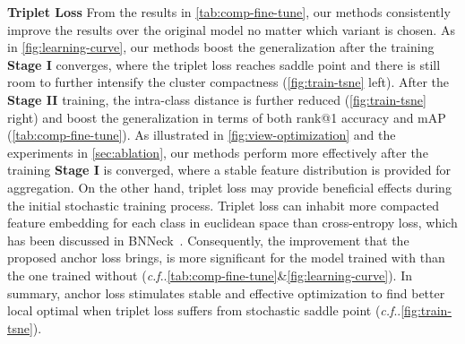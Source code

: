\documentclass[runningheads]{llncs}
\makeatletter
\DeclareRobustCommand\onedot{\futurelet\@let@token\@onedot}
\def\@onedot{\ifx\@let@token.\else.\null\fi\xspace}
\def\cf{\emph{c.f}\onedot} \def\Cf{\emph{C.f}\onedot}
\makeatother
\begin{document}
\noindent\textbf{Triplet Loss} From the results in \cref{tab:comp-fine-tune}, our methods consistently improve the results over the original model no matter which variant is chosen.
As in \cref{fig:learning-curve}, our methods boost the generalization after the training \textbf{Stage I} converges, where the triplet loss reaches saddle point and there is still room to further intensify the cluster compactness (\cref{fig:train-tsne} left).
After the \textbf{Stage II} training, the intra-class distance is further reduced (\cref{fig:train-tsne} right) and boost the generalization in terms of both rank@1 accuracy and mAP (\cref{tab:comp-fine-tune}).
As illustrated in \cref{fig:view-optimization} and the experiments in \cref{sec:ablation}, our methods perform more effectively after the training \textbf{Stage I} is converged, where a stable feature distribution is provided for aggregation.
On the other hand, triplet loss may provide beneficial effects during the initial stochastic training process.
Triplet loss can inhabit more compacted feature embedding for each class in euclidean space than cross-entropy loss, which has been discussed in BNNeck~\cite{luo-bnneck}.
Consequently, the improvement that the proposed anchor loss brings, is more significant for the model trained with  than the one trained without  (\cf \cref{tab:comp-fine-tune}\&\cref{fig:learning-curve}).
In summary, anchor loss stimulates stable and effective optimization to find better local optimal when triplet loss suffers from stochastic saddle point (\cf \cref{fig:train-tsne}).
\end{document}
